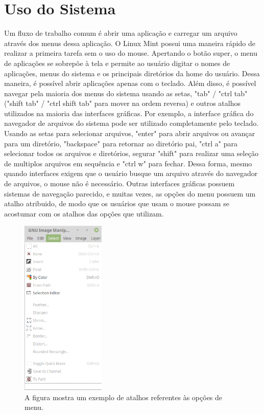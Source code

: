 \documentclass[oneside, 11 pt]{article}
\begin{document}
	\section{Uso do Sistema}
	Um fluxo de trabalho comum é abrir uma aplicação e carregar um arquivo através dos menus dessa aplicação. O Linux Mint possui uma maneira rápido de realizar a primeira tarefa sem o uso do mouse. Apertando o botão super, o menu de aplicações se sobrepõe à tela e permite ao usuário digitar o nomes de aplicações, menus do sistema e os principais diretórios da home do usuário. Dessa maneira, é possível abrir aplicações apenas com o teclado. Além disso, é possível navegar pela maioria dos menus do sistema usando as setas, "tab" / "ctrl tab" ("shift tab" / "ctrl shift tab" para mover na ordem reversa) e outros atalhos utilizados na maioria das interfaces gráficas. Por exemplo, a interface gráfica do navegador de arquivos do sistema pode ser utilizado completamente pelo teclado. Usando as setas para selecionar arquivos, "enter" para abrir arquivos ou avançar para um diretório, "backspace" para retornar ao diretório pai, "ctrl a" para selecionar todos os arquivos e diretórios, segurar "shift" para realizar uma seleção de multiplos arquivos em sequência e "ctrl w" para fechar. Dessa forma, mesmo quando interfaces exigem que o usuário busque um arquivo através do navegador de arquivos, o mouse não é necessário. Outras interfaces gráficas possuem sistemas de navegação parecido, e muitas vezes, as opções do menu possuem um atalho atribuido, de modo que os usuários que usam o mouse possam se acostumar com os atalhos das opções que utilizam.
	\begin{figure}[h]
		\centering
		\includegraphics[width=4.0cm]{shotc.png}
		\caption{A figura mostra um exemplo de atalhos referentes às opções de menu.}
		\label{fig:shortc}
	\end{figure}
	
\end{document}
